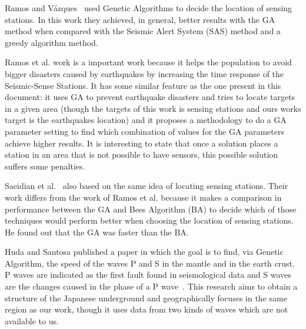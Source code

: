 Ramos and Vázques~\cite{Ramos2011} used Genetic Algorithms to decide the location of sensing stations. In this work they achieved, in general, better results with the GA method when compared with the Seismic Alert System (SAS) method and a greedy algorithm method. %

Ramos et al. work is a important work because it helps the population to avoid bigger disasters caused by earthquakes by increasing the time response of the Seismic-Sense Stations. It has some similar feature as the one present in this document: it uses GA to prevent earthquake disasters and tries to locate targets in a given area (though the targets of this work is sensing stations and ours works target is the earthquakes location) and it proposes a methodology to do a GA parameter setting to find which combination of values for the GA parameters achieve higher results. It is interesting to state that once a solution places a station in an area that is not possible to have sensors, this possible solution suffers some penalties.

Saeidian et al.~\cite{saeidian2016evaluation} also based on the same idea of locating sensing stations. Their work differs from the work of Ramos et al. because it makes a comparison in performance between the GA and Bees Algorithm (BA) to decide which of those techniques would perform better when choosing the location of sensing stations. He found out that the GA was faster than the BA.

Huda and Santosa \cite{ijse5762} published a paper in which the goal is to find, via Genetic Algorithm, the speed of the waves P and S in the mantle and in the earth crust. P waves are indicated as the first fault found in seismological data and S waves are the changes caused in the phase of a P wave~\cite{ijse5762}. This research aims to obtain a structure of the Japanese underground and geographically focuses in the same region as our work, though it uses data from two kinds of waves which are not available to us.



